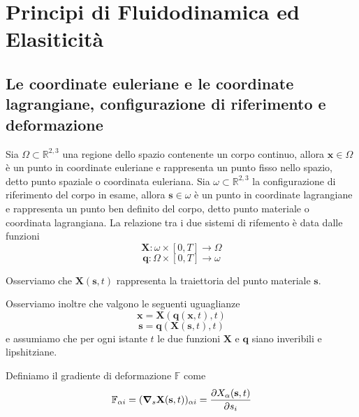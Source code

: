 
\chapter{Principi di Fluidodinamica ed Elasiticità}


\section{Le coordinate euleriane e le coordinate lagrangiane, configurazione di riferimento e deformazione}

Sia $\Omega \subset \mathbb{R}^{2,3}$ una regione dello spazio contenente un corpo continuo, allora $\mathbf{x} \in \Omega$ è un punto in coordinate euleriane e rappresenta un punto fisso nello spazio, detto punto spaziale o coordinata euleriana. 
Sia $\omega \subset \mathbb{R}^{2,3}$ la configurazione di riferimento del corpo in esame, allora $\mathbf{s} \in \omega$ è un punto in coordinate lagrangiane e rappresenta un punto ben definito del corpo, detto punto materiale o coordinata lagrangiana.
La relazione tra i due sistemi di rifemento è data dalle funzioni
\begin{equation*}  
\mathbf{X}:\omega \times [0,T] \to \Omega
\end{equation*}
\begin{equation*}  
\mathbf{q}:\Omega \times [0,T] \to \omega
\end{equation*}

Osserviamo che $\mathbf{X}(\mathbf{s},t)$ rappresenta la traiettoria del punto materiale $\mathbf{s}$.

Osserviamo inoltre che valgono le seguenti uguaglianze
\begin{equation*}  
\mathbf{x} = \mathbf{X}(\mathbf{q}(\mathbf{x},t),t)
\end{equation*}
\begin{equation*}  
\mathbf{s} = \mathbf{q}(\mathbf{X}(\mathbf{s},t),t)
\end{equation*}
e assumiamo che per ogni istante $t$ le due funzioni $\mathbf{X}$ e $\mathbf{q}$ siano inveribili e lipshitziane.

Definiamo il gradiente di deformazione $\mathbb{F}$ come
\begin{equation*}  
\mathbb{F}_{\alpha i} = (\boldsymbol{\nabla}_{s}\mathbf{X}(\mathbf{s},t))_{\alpha i} = \frac{\partial X_{\alpha}(\mathbf{s},t)}{\partial s_{i}}
\end{equation*}


